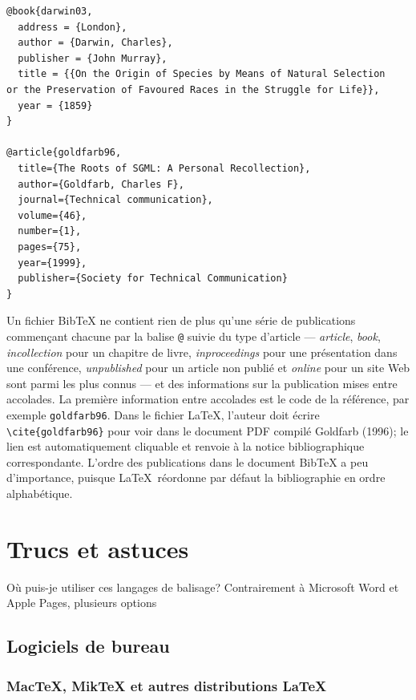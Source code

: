 \documentclass[
  letterpaper,
]{scrbook}
\begin{document}
\begin{verbatim}
@book{darwin03,
  address = {London},
  author = {Darwin, Charles},
  publisher = {John Murray},
  title = {{On the Origin of Species by Means of Natural Selection
or the Preservation of Favoured Races in the Struggle for Life}},
  year = {1859}
}

@article{goldfarb96,
  title={The Roots of SGML: A Personal Recollection},
  author={Goldfarb, Charles F},
  journal={Technical communication},
  volume={46},
  number={1},
  pages={75},
  year={1999},
  publisher={Society for Technical Communication}
}
\end{verbatim}

Un fichier BibTeX ne contient rien de plus qu'une série de publications
commençant chacune par la balise \texttt{@} suivie du type d'article ---
\emph{article}, \emph{book}, \emph{incollection} pour un chapitre de
livre, \emph{inproceedings} pour une présentation dans une conférence,
\emph{unpublished} pour un article non publié et \emph{online} pour un
site Web sont parmi les plus connus --- et des informations sur la
publication mises entre accolades. La première information entre
accolades est le code de la référence, par exemple \texttt{goldfarb96}.
Dans le fichier \LaTeX, l'auteur doit écrire
\texttt{\textbackslash{}cite\{goldfarb96\}} pour voir dans le document
PDF compilé Goldfarb (1996); le lien est automatiquement cliquable et
renvoie à la notice bibliographique correspondante. L'ordre des
publications dans le document BibTeX a peu d'importance, puisque
\LaTeX~réordonne par défaut la bibliographie en ordre alphabétique.

\hypertarget{trucs-et-astuces-1}{%
\section{Trucs et astuces}\label{trucs-et-astuces-1}}

Où puis-je utiliser ces langages de balisage? Contrairement à Microsoft
Word et Apple Pages, plusieurs options

\hypertarget{logiciels-de-bureau}{%
\subsection{Logiciels de bureau}\label{logiciels-de-bureau}}

\hypertarget{mactex-miktex-et-autres-distributions}{%
\subsubsection{\texorpdfstring{MacTeX, MikTeX et autres distributions
\LaTeX}{MacTeX, MikTeX et autres distributions }}\label{mactex-miktex-et-autres-distributions}}
\end{document}
